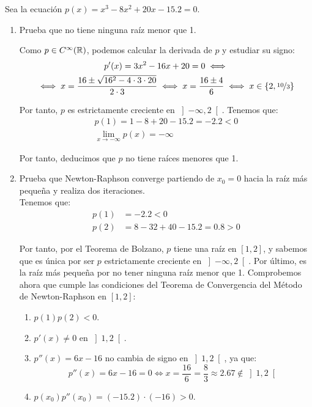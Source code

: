 \begin{ejercicio}
    Sea la ecuación $p(x) = x^3 - 8x^2 + 20x - 15.2 = 0$.
    \begin{enumerate}
        \item Prueba que no tiene ninguna raíz menor que 1.
        
        Como $p\in C^\infty(\mathbb{R})$, podemos calcular la derivada de $p$ y estudiar su signo:
        \begin{multline*}
            p'(x) = 3x^2 - 16x + 20 = 0
            \iff \\ \iff x = \frac{16 \pm \sqrt{16^2 - 4\cdot 3\cdot 20}}{2\cdot 3}
            \iff x = \frac{16 \pm 4}{6}
            \iff x\in \{2, \nicefrac{10}{3}\}
        \end{multline*}

        Por tanto, $p$ es estrictamente creciente en $\left]-\infty, 2\right[$. Tenemos que:
        \begin{align*}
            p(1)=1-8+20-15.2= -2.2 < 0\\
            \lim_{x\to -\infty} p(x) = -\infty
        \end{align*}

        Por tanto, deducimos que $p$ no tiene raíces menores que 1.

        \item Prueba que Newton-Raphson converge partiendo de $x_0 = 0$ hacia la raíz más pequeña y realiza dos iteraciones.\\
        
        Tenemos que:
        \begin{align*}
            p(1)&=-2.2<0\\
            p(2)&=8-32+40-15.2=0.8>0
        \end{align*}

        Por tanto, por el Teorema de Bolzano, $p$ tiene una raíz en $\left[1,2\right]$, y sabemos que es única por ser $p$ estrictamente creciente en $\left]-\infty, 2\right[$. Por último, es la raíz más pequeña por no tener ninguna raíz menor que 1. Comprobemos ahora que cumple las condiciones del Teorema de Convergencia del Método de Newton-Raphson en $\left[1,2\right]$:
        \begin{enumerate}
            \item $p(1)p(2)<0$.
            \item $p'(x)\neq 0$ en $\left]1,2\right[$.
            \item $p''(x)=6x-16$ no cambia de signo en $\left]1,2\right[$, ya que:
            \begin{equation*}
                p''(x)=6x-16=0 \iff x=\frac{16}{6}=\frac{8}{3}\approx 2.67\notin \left]1,2\right[
            \end{equation*}
            \item $p(x_0)p''(x_0)=(-15.2)\cdot (-16)>0$.
        \end{enumerate}


\end{enumerate}
\end{ejercicio}
